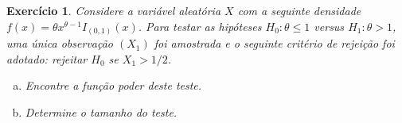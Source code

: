 \documentclass[letter,11pt]{article}
\newtheorem{exer}{Exercício}
\begin{document}
\begin{exer} \rm
Considere a variável aleatória $X$ com a seguinte densidade $f(x) = \theta x^{\theta-1}I_{(0,1)}(x)$. Para testar as hipóteses $H_0 : \theta \leq 1$ versus $H_1: \theta > 1$, uma única observação $(X_1)$ foi amostrada e o seguinte critério de rejeição foi adotado: rejeitar $H_0$ se $X_1 > 1/2$.
\begin{enumerate}[a)]
  \item Encontre a função poder deste teste.
  \item Determine o tamanho do teste.
\end{enumerate}
\end{exer}

% 
% 
% 
% 
% 
% 
% 


% 
\end{document}

